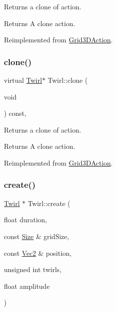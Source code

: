 Returns a clone of action.

\begin{DoxyReturn}{Returns}
A clone action. 
\end{DoxyReturn}


Reimplemented from \hyperlink{classGrid3DAction_a01d5b2d60654ef66d6551ac2190ed14c}{Grid3\+D\+Action}.

\mbox{\label{classTwirl_a9121ce0fe151b7f7224caab88f688aab}} 
\subsubsection{\texorpdfstring{clone()}{clone()}\hspace{0.1cm}{\footnotesize\ttfamily [2/2]}}
{\footnotesize\ttfamily virtual \hyperlink{classTwirl}{Twirl}$\ast$ Twirl\+::clone (\begin{DoxyParamCaption}\item[{void}]{ }\end{DoxyParamCaption}) const\hspace{0.3cm}{\ttfamily [override]}, {\ttfamily [virtual]}}

Returns a clone of action.

\begin{DoxyReturn}{Returns}
A clone action. 
\end{DoxyReturn}


Reimplemented from \hyperlink{classGrid3DAction_a01d5b2d60654ef66d6551ac2190ed14c}{Grid3\+D\+Action}.

\mbox{\label{classTwirl_a3d7846d173ada9cb11329e08d4178454}} 
\subsubsection{\texorpdfstring{create()}{create()}\hspace{0.1cm}{\footnotesize\ttfamily [1/2]}}
{\footnotesize\ttfamily \hyperlink{classTwirl}{Twirl} $\ast$ Twirl\+::create (\begin{DoxyParamCaption}\item[{float}]{duration,  }\item[{const \hyperlink{classSize}{Size} \&}]{grid\+Size,  }\item[{const \hyperlink{classVec2}{Vec2} \&}]{position,  }\item[{unsigned int}]{twirls,  }\item[{float}]{amplitude }\end{DoxyParamCaption})\hspace{0.3cm}{\ttfamily [static]}}



